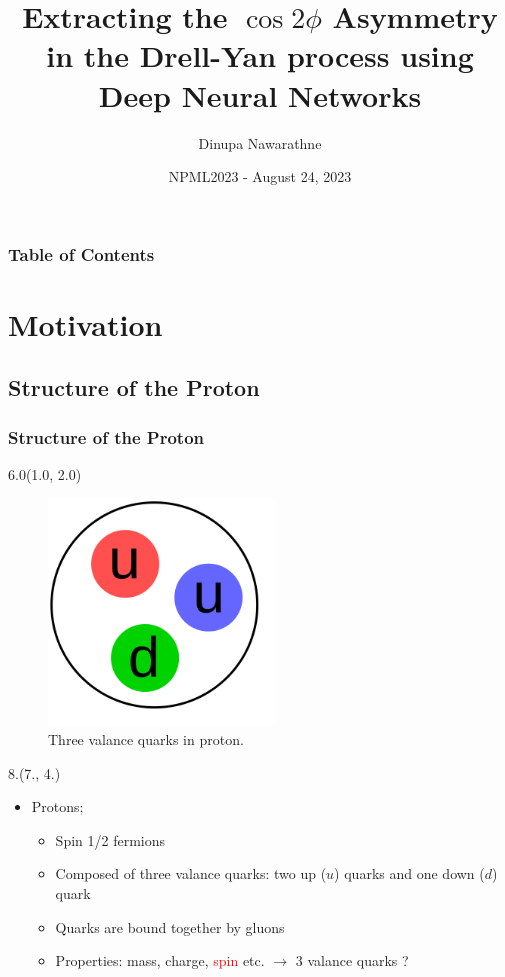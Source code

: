 \documentclass[12pt, xcolor={dvipsnames}, aspectratio = 169, sans,mathserif]{beamer}
\title{Extracting the $\cos2\phi$ Asymmetry in the Drell-Yan process using Deep Neural Networks}
\author{Dinupa Nawarathne}
\institute{New Mexico State University \\
  Representing the E906/SeaQuest Collaboration
}
\date{NPML2023 - August 24, 2023}
\newenvironment{List}[2]
{\begin{textblock}{#1}#2
\begin{itemize}}
{\end{itemize}
\end{textblock}}
\newenvironment{Pic}[2]
{\begin{textblock}{#1}#2
\begin{figure}}
{\end{figure}
\end{textblock}}
\begin{document}
\begin{frame}
    \maketitle
\end{frame}

\begin{frame}
    \frametitle{Table of Contents}
    \tableofcontents
\end{frame}

\section{Motivation}
\subsection{Structure of the Proton}

\begin{frame}
\frametitle{Structure of the Proton}

\begin{Pic}{6.0}{(1.0, 2.0)}
    \includegraphics[width=6.0cm]{imgs/proton3.png}
    \caption{Three valance quarks in proton.}
\end{Pic}

\begin{List}{8.}{(7., 4.)}

    \item Protons;

    \begin{itemize}

        \item Spin 1/2 fermions

        \item Composed of three valance quarks: two up ($u$) quarks and one down ($d$) quark

        \item Quarks are bound together by gluons

        \item Properties: mass, charge, \textcolor{red}{spin} etc. $\rightarrow$ 3 valance quarks ?

    \end{itemize}

\end{List}

\end{frame}
\end{document}
